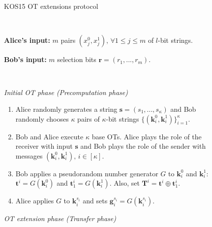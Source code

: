 \begin{figure}
    \centering
        \begin{tcolorbox}
                        
			\centerline{KOS15 OT extensions protocol \citep{KOS15}}
            
			\ 

    \textbf{Alice's input:} $m$ pairs $(x^0_j, x^1_j),\, \forall 1\leq j\leq m$ of $l$-bit strings.
    
    \textbf{Bob's input:} $m$ selection bits $\boldsymbol{r} = (r_1, ..., r_m)$.
    
    \
    
    \textit{Initial OT phase (Precomputation phase)}
    \begin{enumerate}
         \item Alice randomly generates a string $\boldsymbol{s} = (s_1, ..., s_\kappa)$ and Bob randomly chooses $\kappa$ pairs of $\kappa$-bit strings $\{(\boldsymbol{k}^0_i, \boldsymbol{k}^1_i)\}^\kappa_{i=1}$.
         \item Bob and Alice execute $\kappa$ base OTs. Alice plays the role of the receiver with input $\boldsymbol{s}$ and Bob plays the role of the sender with messages $(\boldsymbol{k}^0_i, \boldsymbol{k}^1_i),\, i\in[\kappa]$.
         \item Bob applies a pseudorandom number generator $G$ to $\boldsymbol{k}^0_i$ and $\boldsymbol{k}^1_i$: $\boldsymbol{t}^i = G(\boldsymbol{k}^0_i)$ and $\boldsymbol{t}^i_1 = G(\boldsymbol{k}^1_i)$. Also, set $\boldsymbol{T}^i = \boldsymbol{t}^i \oplus \boldsymbol{t}^i_1$.
         \item Alice applies $G$ to $\boldsymbol{k}^{s_i}_i$ and sets $\boldsymbol{g}^{s_i}_i = G(\boldsymbol{k}^{s_i}_i)$.
    \end{enumerate}
    \textit{OT extension phase (Transfer phase)}
    

\end{tcolorbox}
\end{figure}
